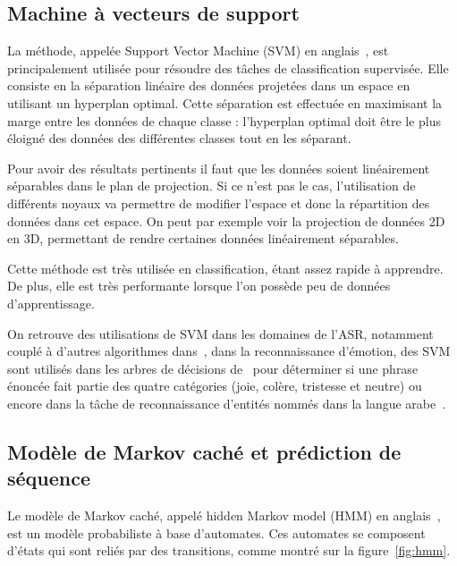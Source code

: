\subsection{Machine à vecteurs de support}
La méthode, appelée Support Vector Machine (SVM) en anglais~\cite{Cortes1995}, est principalement utilisée pour résoudre des tâches de classification supervisée. Elle consiste en la séparation linéaire des données projetées dans un espace en utilisant un hyperplan optimal. Cette séparation est effectuée en maximisant la marge entre les données de chaque classe : l'hyperplan optimal doit être le plus éloigné des données des différentes classes tout en les séparant.

Pour avoir des résultats pertinents il faut que les données soient linéairement séparables dans le plan de projection. Si ce n'est pas le cas, l'utilisation de différents noyaux va permettre de modifier l'espace et donc la répartition des données dans cet espace. On peut par exemple voir la projection de données 2D en 3D, permettant de rendre certaines données linéairement séparables.

Cette méthode est très utilisée en classification, étant assez rapide à apprendre. De plus, elle est très performante lorsque l'on possède peu de données d'apprentissage.

On retrouve des utilisations de SVM dans les domaines de l'ASR, notamment couplé à d'autres algorithmes dans~\cite{Solera2007}, dans la reconnaissance d'émotion, des SVM sont utilisés dans les arbres de décisions de~\cite{Rozgic2012} pour déterminer si une phrase énoncée fait partie des quatre catégories (joie, colère, tristesse et neutre) ou encore dans la tâche de reconnaissance d'entités nommés dans la langue arabe~\cite{Benajiba2008}.

\subsection{Modèle de Markov caché et prédiction de séquence}

Le modèle de Markov caché, appelé hidden Markov model (HMM) en anglais~\cite{Rabiner1986}, est un modèle probabiliste à base d'automates. Ces automates se composent d'états qui sont reliés par des transitions, comme montré sur la figure~\ref{fig:hmm}.

